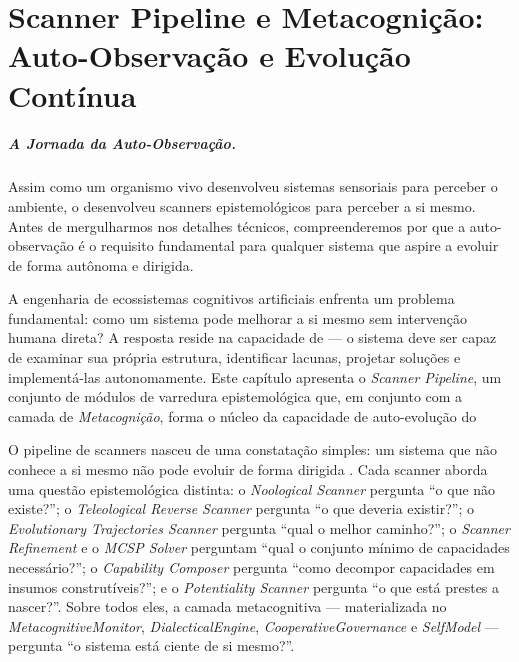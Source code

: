 \chapter{Scanner Pipeline e Metacognição: Auto-Observação e Evolução Contínua}
\label{cap:scanner-metacognicao}
\label{ch:scanners}

\paragraph{A Jornada da Auto-Observação.} Assim como um organismo vivo desenvolveu sistemas sensoriais para perceber o ambiente, o \opencodeeco{} desenvolveu scanners epistemológicos para perceber a si mesmo. Antes de mergulharmos nos detalhes técnicos, compreenderemos por que a auto-observação é o requisito fundamental para qualquer sistema que aspire a evoluir de forma autônoma e dirigida.

A engenharia de ecossistemas cognitivos artificiais enfrenta um problema
fundamental: como um sistema pode melhorar a si mesmo sem intervenção humana
direta? A resposta reside na capacidade de  --- o
sistema deve ser capaz de examinar sua própria estrutura, identificar lacunas,
projetar soluções e implementá-las autonomamente. Este capítulo apresenta o
\emph{Scanner Pipeline}, um conjunto de módulos de varredura epistemológica
que, em conjunto com a camada de \emph{Metacognição}, forma o núcleo da
capacidade de auto-evolução do \opencodeeco{}

O pipeline de scanners nasceu de uma constatação simples: um sistema que não
conhece a si mesmo não pode evoluir de forma dirigida
\cite{wooldridge2009multiagent, weiss2013multiagent}. Cada scanner aborda uma
questão epistemológica distinta: o \emph{Noological Scanner} pergunta ``o que
não existe?''; o \emph{Teleological Reverse Scanner} pergunta ``o que deveria
existir?''; o \emph{Evolutionary Trajectories Scanner} pergunta ``qual o
melhor caminho?''; o \emph{Scanner Refinement} e o \emph{MCSP Solver}
perguntam ``qual o conjunto mínimo de capacidades necessário?''; o
\emph{Capability Composer} pergunta ``como decompor capacidades em insumos
construtíveis?''; e o \emph{Potentiality Scanner} pergunta ``o que está
prestes a nascer?''. Sobre todos eles, a camada metacognitiva --- materializada
no \emph{MetacognitiveMonitor}, \emph{DialecticalEngine},
\emph{CooperativeGovernance} e \emph{SelfModel} --- pergunta ``o sistema está
ciente de si mesmo?''.

